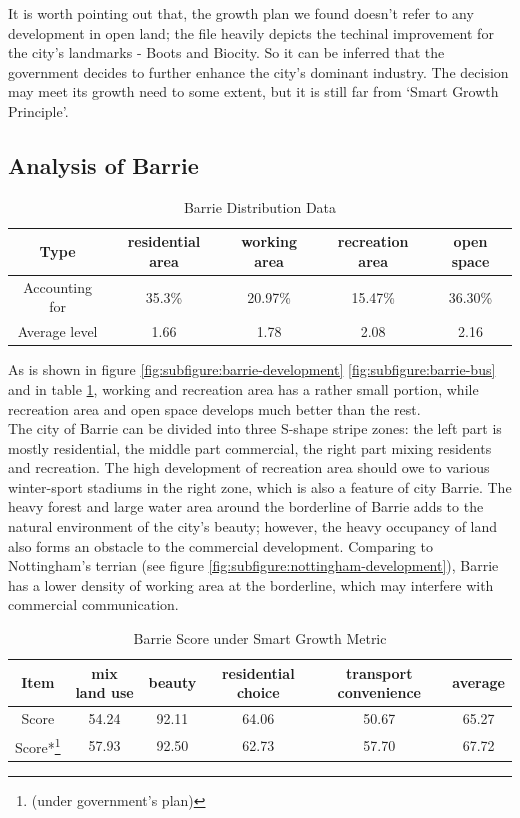 It is worth pointing out that, the growth plan we found doesn't refer to any development in open land; the file heavily depicts the techinal improvement for the city's landmarks - Boots and Biocity.
So it can be inferred that the government decides to further enhance the city's dominant industry.
The decision may meet its growth need to some extent, but it is still far from `Smart Growth Principle'.

\subsection{Analysis of Barrie}
\begin{table}[t]
\centering
  \begin{tabular}{c|cccc}
    \hline
    Type & residential area & working area & recreation area & open space \\
    \hline
    Accounting for & 35.3\% & 20.97\% & 15.47\% & 36.30\% \\
    \hline
    Average level & 1.66 & 1.78 & 2.08 & 2.16 \\
    \hline
  \end{tabular}
  \caption{Barrie Distribution Data}
  \label{tab:barrie-data}
\end{table}

As is shown in figure \ref{fig:subfigure:barrie-development} \ref{fig:subfigure:barrie-bus} and in table \ref{tab:barrie-data}, working and recreation area has a rather small portion, while recreation area and open space develops much better than the rest.\\

The city of Barrie can be divided into three S-shape stripe zones: the left part is mostly residential, the middle part commercial, the right part mixing residents and recreation.
The high development of recreation area should owe to various winter-sport stadiums in the right zone, which is also a feature of city Barrie.
The heavy forest and large water area around the borderline of Barrie adds to the natural environment of the city's beauty; however, the heavy occupancy of land also forms an obstacle to the commercial development.
Comparing to Nottingham's terrian (see figure \ref{fig:subfigure:nottingham-development}), Barrie has a lower density of working area at the borderline, which may interfere with commercial communication.\\
\begin{table}[t]
\centering
  \begin{tabular}{c|cccc|c}
    \hline
    Item & mix land use & beauty & residential choice & transport convenience & average \\
    \hline
    Score & 54.24 & 92.11 & 64.06 & 50.67 & 65.27 \\
    Score*\footnote{(under government's plan)} & 57.93 & 92.50 & 62.73 & 57.70 & 67.72\\
    \hline
  \end{tabular}
  \caption{Barrie Score under Smart Growth Metric}
  \label{tab:barrie-score}
\end{table}

